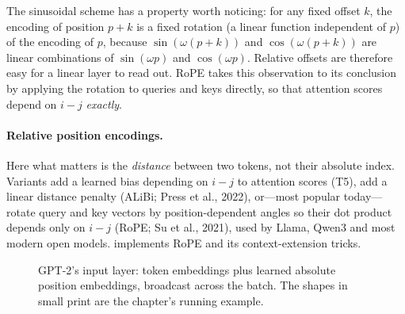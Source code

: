 The sinusoidal scheme has a property worth noticing: for any fixed offset $k$, the encoding of
position $p+k$ is a fixed rotation (a linear function independent of $p$) of the encoding of $p$,
because $\sin(\omega(p+k))$ and $\cos(\omega(p+k))$ are linear combinations of $\sin(\omega p)$ and
$\cos(\omega p)$. Relative offsets are therefore easy for a linear layer to read out. RoPE takes
this observation to its conclusion by applying the rotation to queries and keys directly, so that
attention scores depend on $i-j$ \emph{exactly}.

\paragraph{Relative position encodings.} Here what matters is the \emph{distance} between two
tokens, not their absolute index. Variants add a learned bias depending on $i-j$ to attention
scores (T5), add a linear distance penalty (ALiBi; Press et al., 2022), or---most popular
today---rotate query and key vectors by position-dependent angles so their dot product depends only
on $i-j$ (RoPE; Su et al., 2021), used by Llama, Qwen3 and most modern open models.
 implements RoPE and its context-extension tricks.

\begin{figure}[t]
\centering
{}
\caption{GPT-2's input layer: token embeddings plus learned absolute position embeddings,
broadcast across the batch. The shapes in small print are the chapter's running example.}
\label{fig:text:posemb}
\end{figure}

